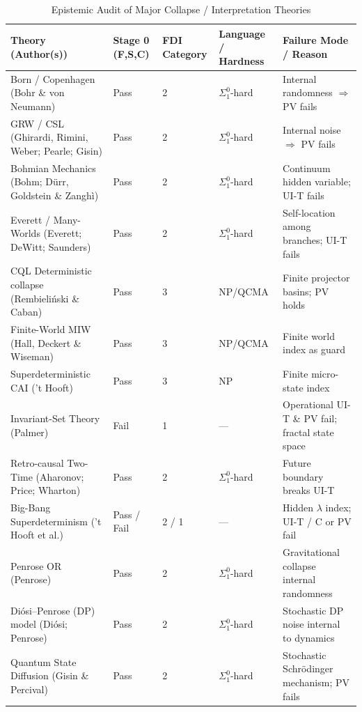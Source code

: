 \documentclass[12pt]{article}
\theoremstyle{definition}
\theoremstyle{plain}
\begin{document}
\begin{table}[ht]
\centering
\caption{Epistemic Audit of Major Collapse / Interpretation Theories}
\label{tab:epistemic-audit-full}
\setlength\tabcolsep{0pt} %
\footnotesize \tiny
\begin{tabular*}{\textwidth}{|p{7cm}|p{1.5cm}|p{1cm}|p{2cm}|p{4.5cm}|}
\hline
\textbf{Theory (Author(s))} & \textbf{Stage 0 (F,S,C)} & \textbf{FDI Category} & \textbf{Language / Hardness} & \textbf{Failure Mode / Reason} \\
\hline
Born / Copenhagen (Bohr \& von Neumann) & Pass & 2 &  \(\Sigma^0_1\)-hard & Internal randomness $\Rightarrow$ PV fails \\
\hline
GRW / CSL (Ghirardi, Rimini, Weber; Pearle; Gisin) & Pass & 2 &  \(\Sigma^0_1\)-hard & Internal noise $\Rightarrow$ PV fails \\
\hline
Bohmian Mechanics (Bohm; Dürr, Goldstein \& Zanghì) & Pass & 2 &  \(\Sigma^0_1\)-hard & Continuum hidden variable; UI-T fails \\
\hline
Everett / Many-Worlds (Everett; DeWitt; Saunders) & Pass & 2 &  \(\Sigma^0_1\)-hard & Self-location among branches; UI-T fails \\
\hline
CQL Deterministic collapse (Rembieliński \& Caban) & Pass & 3 &  NP/QCMA & Finite projector basins; PV holds \\
\hline
Finite-World MIW (Hall, Deckert \& Wiseman) & Pass & 3 &  NP/QCMA & Finite world index as guard \\
\hline
Superdeterministic CAI (’t Hooft) & Pass & 3 &  NP & Finite micro-state index \\
\hline
Invariant-Set Theory (Palmer) & Fail & 1 & --- & Operational UI-T \& PV fail; fractal state space \\
\hline
Retro-causal Two-Time (Aharonov; Price; Wharton) & Pass & 2 &  \(\Sigma^0_1\)-hard & Future boundary breaks UI-T \\
\hline
Big-Bang Superdeterminism (’t Hooft et al.) & Pass / Fail & 2 / 1 & --- & Hidden \(\lambda\) index; UI-T / C or PV fail \\
\hline
Penrose OR (Penrose) & Pass & 2 &  \(\Sigma^0_1\)-hard & Gravitational collapse internal randomness \\
\hline
Diósi–Penrose (DP) model (Diósi; Penrose) & Pass & 2 &  \(\Sigma^0_1\)-hard & Stochastic DP noise internal to dynamics \\
\hline
Quantum State Diffusion (Gisin \& Percival)& Pass & 2 &  \(\Sigma^0_1\)-hard & Stochastic Schrödinger mechanism; PV fails \\

\end{tabular*}
\end{table}
\end{document}
